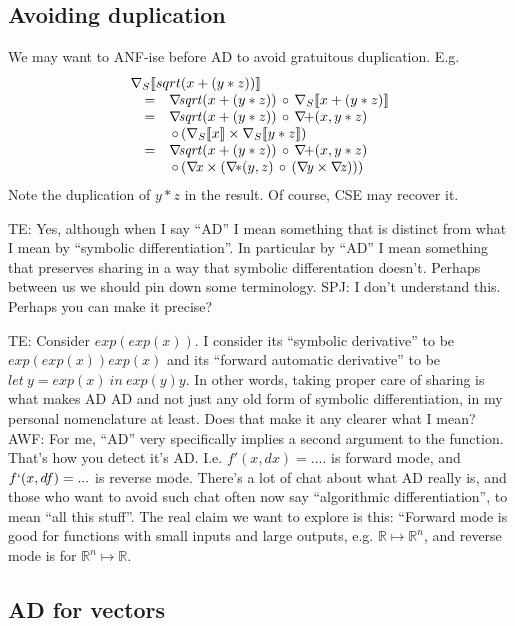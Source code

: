 \documentclass[sigplan,review]{acmart}
\newcommand{\grad}[1]{\nabla_S\lb #1 \rb}  %
\newcommand{\gradf}[1]{\nabla\! \mathit{#1}}  %
\newcommand{\lb}{\llbracket}
\newcommand{\rb}{\rrbracket}
\def\RR{\mathbb R}
\newcommand{\lmcomp}{\,\circ\,}   %
\newcommand{\lmpair}{\times}         %
\newcommand{\simon}[1]{{\color{red}SPJ: #1}}
\newcommand{\tom}[1]{{\color{red}TE: #1}}
\newcommand{\awf}[1]{{\color{teal}AWF: #1}}
\begin{document}
\subsection{Avoiding duplication}

We may want to ANF-ise before AD to avoid gratuitous duplication.
  E.g.
$$
  \begin{array}{rcl}
    \multicolumn{3}{l}{\grad{sqrt(x+(y*z))}} \\
      & = & \gradf{sqrt}(x+(y*z)) \lmcomp \grad{x+(y*z)} \\
    & = & \gradf{sqrt}(x+(y*z)) \lmcomp  \gradf{+}(x, y*z) \\
     && \lmcomp (\grad{x} \lmpair \grad{y*z}) \\
    & = & \gradf{sqrt}(x+(y*z)) \lmcomp \gradf{+}(x, y*z) \\
    & & \lmcomp (\gradf{x} \lmpair (\gradf{*}(y,z) \lmcomp (\gradf{y} \lmpair \gradf{z}))) \\
  \end{array}
  $$
Note the duplication of $y*z$ in the result.
Of course, CSE may recover it.

\tom{Yes, although when I say ``AD'' I mean something that is distinct
  from what I mean by ``symbolic differentiation''.  In particular by
  ``AD'' I mean something that preserves sharing in a way that
  symbolic differentation doesn't.  Perhaps between us we should pin
  down some terminology.} \simon{I don't understand this. Perhaps you can make
  it precise?}

\tom{Consider $exp(exp(x))$.  I consider its ``symbolic derivative''
  to be $exp(exp(x)) exp(x)$ and its ``forward automatic derivative''
  to be $let~ y = exp(x)~ in~ exp(y) y$.  In other words, taking
  proper care of sharing is what makes AD AD and not just any old form
  of symbolic differentiation, in my personal nomenclature at least.
  Does that make it any clearer what I mean?}
  \awf{For me, ``AD'' very specifically implies a second argument to the function.   That's how you detect it's AD.  I.e.  $f'(x,dx) = ....$ is forward mode, and $f`(x,df) = ...$ is reverse mode.  There's a lot of chat about what AD really is, and those who want to avoid such chat often now say ``algorithmic differentiation'', to mean ``all this stuff''.  The real claim we want to explore is this: ``Forward mode is good for functions with small inputs and large outputs, e.g. $\RR \mapsto \RR^n$, and reverse mode is for $\RR^n \mapsto \RR$.}

\subsection{AD for vectors} \label{sec:ad-vectors}
\end{document}
